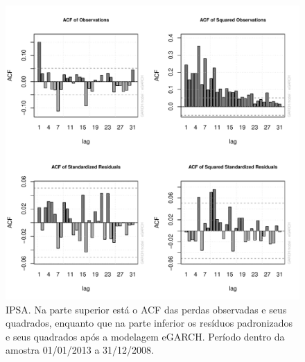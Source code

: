 \documentclass[review]{elsarticle}
\theoremstyle{definition}
\begin{document}
\begin{figure}[H]
	\centering
	\includegraphics[width=1\linewidth]{figs/artigo-acf-IPSA}
	\caption{IPSA. Na parte superior está o ACF das perdas observadas e seus quadrados, enquanto que na parte inferior os resíduos padronizados e seus quadrados após a modelagem eGARCH. Período dentro da amostra 01/01/2013 a 31/12/2008.}
	\label{fig:artigo-acf-ipsa}
\end{figure}
\end{document}
